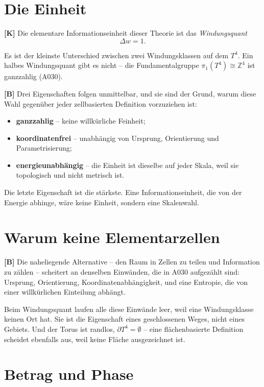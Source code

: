 \section{Die Einheit}

\textbf{[K]} Die elementare Informationseinheit dieser Theorie ist das
\emph{Windungsquant}
\[
  \Delta w = 1 .
\]

Es ist der kleinste Unterschied zwischen zwei Windungsklassen auf dem $T^4$.
Ein halbes Windungsquant gibt es nicht -- die Fundamentalgruppe
$\pi_1(T^4)\cong\mathbb{Z}^4$ ist ganzzahlig (A030).

\textbf{[B]} Drei Eigenschaften folgen unmittelbar, und sie sind der Grund,
warum diese Wahl gegenüber jeder zellbasierten Definition vorzuziehen ist:

\begin{itemize}
  \item \textbf{ganzzahlig} -- keine willkürliche Feinheit;
  \item \textbf{koordinatenfrei} -- unabhängig von Ursprung, Orientierung und
    Parametrisierung;
  \item \textbf{energieunabhängig} -- die Einheit ist dieselbe auf jeder Skala,
    weil sie topologisch und nicht metrisch ist.
\end{itemize}

Die letzte Eigenschaft ist die stärkste. Eine Informationseinheit, die von der
Energie abhinge, wäre keine Einheit, sondern eine Skalenwahl.

\section{Warum keine Elementarzellen}

\textbf{[B]} Die naheliegende Alternative -- den Raum in Zellen zu teilen und
Information zu zählen -- scheitert an denselben Einwänden, die in A030 aufgezählt
sind: Ursprung, Orientierung, Koordinatenabhängigkeit, und eine Entropie, die
von einer willkürlichen Einteilung abhängt.

Beim Windungsquant laufen alle diese Einwände leer, weil eine Windungsklasse
keinen Ort hat. Sie ist die Eigenschaft eines geschlossenen Weges, nicht eines
Gebiets. Und der Torus ist randlos, $\partial T^4=\emptyset$ -- eine
flächenbasierte Definition scheidet ebenfalls aus, weil keine Fläche
ausgezeichnet ist.

\section{Betrag und Phase}

